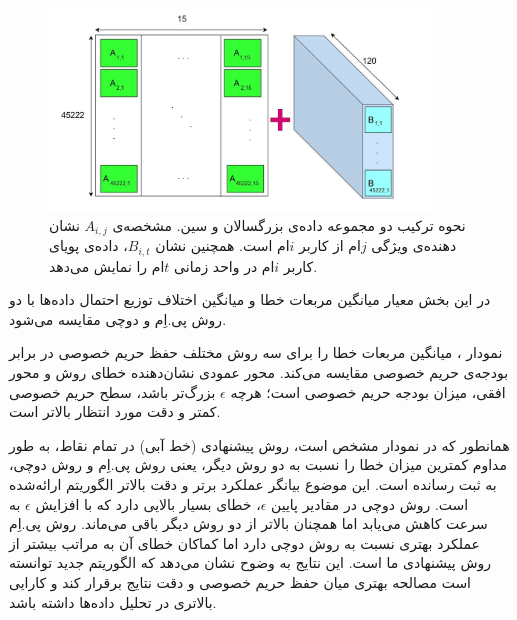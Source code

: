 \begin{figure}[h]
  \centering
  \includegraphics[width=0.9\textwidth]{figs/dataset.jpg}
  \caption{نحوه ترکیب دو مجموعه داده‌ی بزرگسالان و سین. مشخصه‌ی $A_{i,j}$ نشان دهنده‌ی ویژگی $j$ام از کاربر $i$ام است. همچنین نشان $B_{i,t}$، داده‌ی پویای کاربر $i$ام در واحد زمانی $t$ام را نمایش می‌دهد.}
  \label{fig:dataset}
\end{figure}


در این بخش معیار میانگین مربعات خطا و میانگین اختلاف توزیع احتمال داده‌ها با دو روش پی.اِم و دوچی مقایسه می‌شود.


نمودار ، میانگین مربعات خطا را برای سه روش مختلف حفظ حریم خصوصی در برابر بودجه‌ی حریم خصوصی مقایسه می‌کند. محور عمودی نشان‌دهنده خطای روش و محور افقی، میزان بودجه حریم خصوصی است؛ هرچه $\epsilon$ بزرگ‌تر باشد، سطح حریم خصوصی کمتر و دقت مورد انتظار بالاتر است.

همانطور که در نمودار مشخص است، روش پیشنهادی (خط آبی) در تمام نقاط، به طور مداوم کمترین میزان خطا را نسبت به دو روش دیگر، یعنی روش پی.اِم و روش دوچی، به ثبت رسانده است. این موضوع بیانگر عملکرد برتر و دقت بالاتر الگوریتم ارائه‌شده است. روش دوچی در مقادیر پایین $\epsilon$، خطای بسیار بالایی دارد که با افزایش $\epsilon$ به سرعت کاهش می‌یابد اما همچنان بالاتر از دو روش دیگر باقی می‌ماند. روش پی.اِم عملکرد بهتری نسبت به روش دوچی دارد اما کماکان خطای آن به مراتب بیشتر از روش پیشنهادی ما است. این نتایج به وضوح نشان می‌دهد که الگوریتم جدید توانسته است مصالحه بهتری میان حفظ حریم خصوصی و دقت نتایج برقرار کند و کارایی بالاتری در تحلیل داده‌ها داشته باشد.

